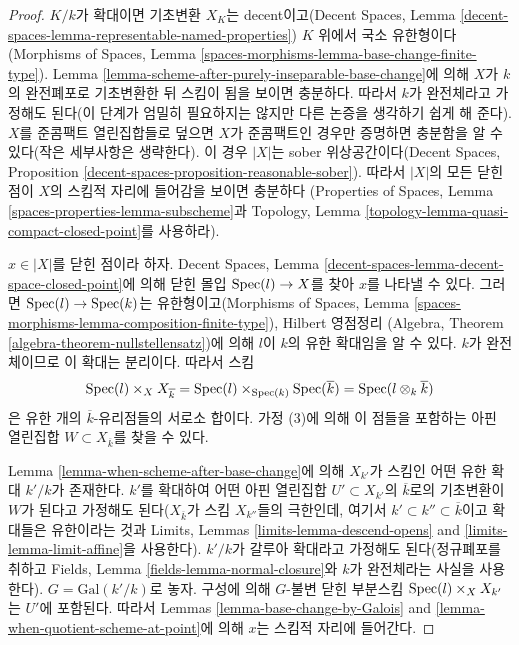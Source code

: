 \begin{proof}
$K/k$가 확대이면 기초변환 $X_K$는 decent이고(Decent Spaces, Lemma
\ref{decent-spaces-lemma-representable-named-properties}) $K$ 위에서
국소 유한형이다(Morphisms of Spaces, Lemma
\ref{spaces-morphisms-lemma-base-change-finite-type}). Lemma
\ref{lemma-scheme-after-purely-inseparable-base-change}에 의해 $X$가 $k$의
완전폐포로 기초변환한 뒤 스킴이 됨을 보이면 충분하다. 따라서 $k$가
완전체라고 가정해도 된다(이 단계가 엄밀히 필요하지는 않지만 다른
논증을 생각하기 쉽게 해 준다). $X$를 준콤팩트 열린집합들로 덮으면
$X$가 준콤팩트인 경우만 증명하면 충분함을 알 수 있다(작은 세부사항은
생략한다). 이 경우 $|X|$는 sober 위상공간이다(Decent Spaces,
Proposition \ref{decent-spaces-proposition-reasonable-sober}). 따라서
$|X|$의 모든 닫힌 점이 $X$의 스킴적 자리에 들어감을 보이면 충분하다
(Properties of Spaces, Lemma \ref{spaces-properties-lemma-subscheme}과
Topology, Lemma \ref{topology-lemma-quasi-compact-closed-point}를 사용하라).

\medskip\noindent
$x \in |X|$를 닫힌 점이라 하자. Decent Spaces, Lemma
\ref{decent-spaces-lemma-decent-space-closed-point}에 의해 닫힌 몰입
$\mathop{\mathrm{Spec}}(l) \to X$를 찾아 $x$를 나타낼 수 있다. 그러면
$\mathop{\mathrm{Spec}}(l) \to \mathop{\mathrm{Spec}}(k)$는 유한형이고(Morphisms of Spaces, Lemma
\ref{spaces-morphisms-lemma-composition-finite-type}), Hilbert 영점정리
(Algebra, Theorem \ref{algebra-theorem-nullstellensatz})에 의해 $l$이
$k$의 유한 확대임을 알 수 있다. $k$가 완전체이므로 이 확대는
분리이다. 따라서 스킴
$$
\mathop{\mathrm{Spec}}(l) \times_X X_{\overline{k}} =
\mathop{\mathrm{Spec}}(l) \times_{\mathop{\mathrm{Spec}}(k)} \mathop{\mathrm{Spec}}(\overline{k}) =
\mathop{\mathrm{Spec}}(l \otimes_k \overline{k})
$$
은 유한 개의 $\overline{k}$-유리점들의 서로소 합이다. 가정 (3)에 의해
이 점들을 포함하는 아핀 열린집합 $W \subset X_{\overline{k}}$를 찾을 수
있다.

\medskip\noindent
Lemma \ref{lemma-when-scheme-after-base-change}에 의해 $X_{k'}$가 스킴인
어떤 유한 확대 $k'/k$가 존재한다. $k'$를 확대하여 어떤 아핀
열린집합 $U' \subset X_{k'}$의 $\overline{k}$로의 기초변환이 $W$가
된다고 가정해도 된다($X_{\overline{k}}$가 스킴 $X_{k''}$들의 극한인데,
여기서 $k' \subset k'' \subset \overline{k}$이고 확대들은 유한이라는 것과
Limits, Lemmas \ref{limits-lemma-descend-opens} and
\ref{limits-lemma-limit-affine}을 사용한다). $k'/k$가 갈루아 확대라고
가정해도 된다(정규폐포를 취하고 Fields, Lemma
\ref{fields-lemma-normal-closure}와 $k$가 완전체라는 사실을 사용한다).
$G = \text{Gal}(k'/k)$로 놓자. 구성에 의해 $G$-불변 닫힌 부분스킴
$\mathop{\mathrm{Spec}}(l) \times_X X_{k'}$는 $U'$에 포함된다. 따라서 Lemmas
\ref{lemma-base-change-by-Galois} and
\ref{lemma-when-quotient-scheme-at-point}에 의해 $x$는 스킴적 자리에
들어간다.
\end{proof}

